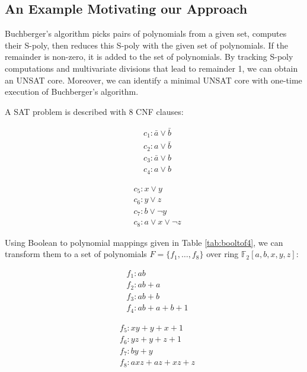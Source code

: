 \subsection{An Example Motivating our Approach}

Buchberger's algorithm picks pairs of polynomials from a given set, computes their S-poly, then reduces this S-poly
with the given set of polynomials. If the remainder is non-zero,
it is added to the set of polynomials.
By tracking S-poly computations and multivariate divisions that lead to remainder 
1, we can obtain an UNSAT core. Moreover, we can identify a minimal UNSAT core with one-time
 execution of Buchberger's algorithm.

\begin{Example}
A SAT problem is described with 8 CNF clauses:

\begin{minipage}[h]{0.3\textwidth}
\begin{align*}
&c_1: \bar{a}\lor\bar{b}\\
&c_2: a\lor\bar{b}\\
&c_3: \bar{a}\lor b\\
&c_4: a\lor b
\end{align*}
\end{minipage}
\begin{minipage}[h]{0.7\textwidth}
\begin{align*}
&c_5: x\lor y\\
&c_6: y\lor z\\
&c_7: b\lor \neg y\\
&c_8: a\lor x\lor \neg z
\end{align*}
\end{minipage}

\vspace{0.1in}
Using Boolean to polynomial mappings given in Table \ref{tab:booltof4}, we can transform them to a set of
polynomials $F=\{f_1,\dots,f_8\}$ over ring $\mathbb F_2[a,b,x,y,z]$:

\begin{minipage}[h]{0.4\textwidth}
\begin{align*}
&f_1:ab\\
&f_2:ab+a\\
&f_3:ab+b\\
&f_4:ab+a+b+1
\end{align*}
\end{minipage}
\begin{minipage}[h]{0.6\textwidth}
\begin{align*}
&f_5:xy+y+x+1\\
&f_6:yz+y+z+1\\
&f_7:by+y\\
&f_8:axz+az+xz+z
\end{align*}
\end{minipage}


\end{Example}
